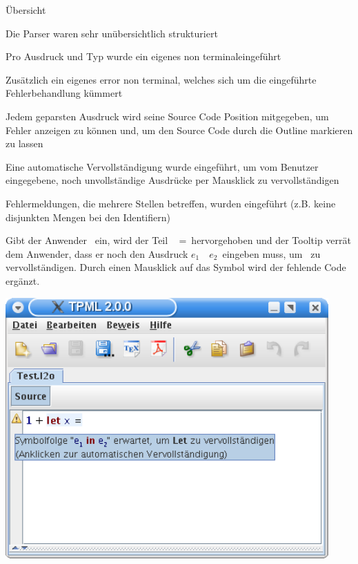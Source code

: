 {
  \begin{itemgroup}{Übersicht}
    \item Die Parser waren sehr unübersichtlich strukturiert
    \item Pro Ausdruck und Typ wurde ein eigenes \glqq non terminal\grqq eingeführt
    \item Zusätzlich ein eigenes \glqq error non terminal\grqq, welches sich um
          die eingeführte Fehlerbehandlung kümmert
    \item Jedem geparsten Ausdruck wird seine Source Code Position mitgegeben, um
          Fehler anzeigen zu können und, um den Source Code durch die Outline
          markieren zu lassen
    \item Eine automatische Vervollständigung wurde eingeführt, um vom Benutzer
          eingegebene, noch unvollständige Ausdrücke per Mausklick zu vervollständigen
    \item Fehlermeldungen, die mehrere Stellen betreffen, wurden eingeführt
          (z.B. keine disjunkten Mengen bei den Identifiern) 
  \end{itemgroup}
}

{
  Gibt der Anwender \glqq {}\grqq\ 
  ein, wird der Teil \glqq \KeyLet\  =\grqq\ hervorgehoben und der Tooltip
  verrät dem Anwender, dass er noch den Ausdruck \glqq $e_1$\ \KeyIn\ $e_2$\grqq\ eingeben muss,
  um \glqq{\bf Let}\grqq\ zu vervollständigen. Durch einen Mausklick auf das Symbol wird der
  fehlende Code ergänzt.
  \begin{center}
    \includegraphics[height=10cm]{images/parser_auto.png}
  \end{center}
}


